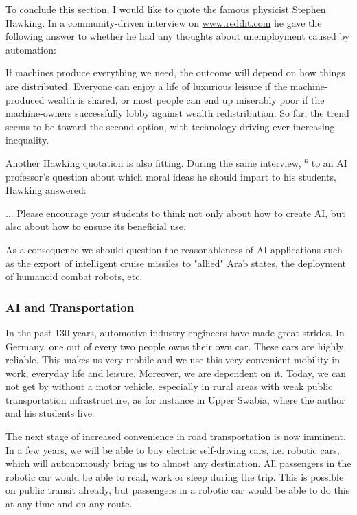 \documentclass[10pt]{book}
\begin{document}
To conclude this section, I would like to quote the famous physicist Stephen Hawking. In a community-driven interview on \href{http://www.reddit.com}{www.reddit.com} he gave the following answer to whether he had any thoughts about unemployment caused by automation:

\begin{displayquote}
If machines produce everything we need, the outcome will depend on how things are distributed. Everyone can enjoy a life of luxurious leisure if the machine-produced wealth is shared, or most people can end up miserably poor if the machine-owners successfully lobby against wealth redistribution. So far, the trend seems to be toward the second option, with technology driving ever-increasing inequality.
\end{displayquote}

Another Hawking quotation is also fitting. During the same interview, ${ }^{6}$ to an AI professor's question about which moral ideas he should impart to his students, Hawking answered:

\begin{displayquote}
... Please encourage your students to think not only about how to create AI, but also about how to ensure its beneficial use.
\end{displayquote}

As a consequence we should question the reasonableness of AI applications such as the export of intelligent cruise missiles to "allied" Arab states, the deployment of humanoid combat robots, etc.

\subsubsection*{AI and Transportation}
In the past 130 years, automotive industry engineers have made great strides. In Germany, one out of every two people owns their own car. These cars are highly reliable. This makes us very mobile and we use this very convenient mobility in work, everyday life and leisure. Moreover, we are dependent on it. Today, we can not get by without a motor vehicle, especially in rural areas with weak public transportation infrastructure, as for instance in Upper Swabia, where the author and his students live.

The next stage of increased convenience in road transportation is now imminent. In a few years, we will be able to buy electric self-driving cars, i.e. robotic cars, which will autonomously bring us to almost any destination. All passengers in the robotic car would be able to read, work or sleep during the trip. This is possible on public transit already, but passengers in a robotic car would be able to do this at any time and on any route.
\end{document}
